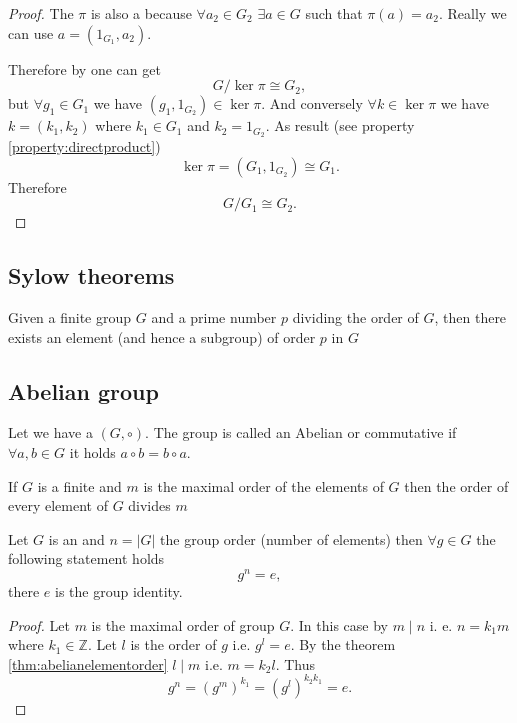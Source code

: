 \begin{appendices}
\begin{property}
\begin{proof}
    The $\pi$ is also a  because $\forall a_2
    \in G_2$ $\exists a \in G$ such that $\pi(a) = a_2$. Really we can
    use $a = (1_{G_1}, a_2)$.
    
    Therefore by  one can get
    \[
    G/\ker{\pi} \cong G_2,
    \]
    but $\forall g_1 \in G_1$ we have $(g_1, 1_{G_2}) \in \ker{\pi}$.
    And conversely $\forall k \in \ker \pi$ we have $k = (k_1, k_2)$
    where $k_1 \in G_1$ and $k_2 = 1_{G_2}$.
    As result (see property \ref{property:directproduct})
    \[
    \ker \pi = \left(G_1, 1_{G_2}\right) \cong G_1.
    \]
    Therefore
    \[
    G/G_1 \cong G_2.
    \]
  \end{proof}
\end{property}

\subsection{Sylow theorems}

\begin{corollary}[Sylow]
  Given a finite group $G$ and a prime number $p$ dividing the order of $G$,
  then there exists an element (and hence a subgroup) of order $p$ in
  $G$ \cite{wiki:sylow}
  \label{cor:sylow}
\end{corollary}

\subsection{Abelian group}

\begin{definition}
  Let we have a  $\left(G, \circ\right)$.
  The group is called an Abelian or commutative if
  $\forall a, b \in G$ it holds $a \circ b = b \circ a$.
  \label{def:abeliangroup}
\end{definition}

\begin{theorem}
  If $G$ is a finite  and $m$ is the maximal
  order of the elements of $G$ then the order of every element of $G$
  divides $m$ 
  \label{thm:abelianelementorder}
\end{theorem}

\begin{theorem}
  Let $G$ is an  and $n = \left|G\right|$
  the group order (number of elements) then $\forall g \in G$ the
  following statement holds
  \[
  g^n = e,
  \]
  there $e$ is the group identity.
  \begin{proof}
    Let $m$ is the maximal order of group $G$. In this case by
     $m \mid n$ i. e. $n = k_1 m$ where $k_1 \in
    \mathbb{Z}$. Let $l$ is the order of $g$ i.e. $g^l = e$. By the
    theorem \ref{thm:abelianelementorder} $l \mid m$ i.e.
    $m = k_2 l$. Thus
    \[
    g^n = \left(g^m\right)^{k_1} = 
    \left(g^l\right)^{k_2 k_1} = e.
    \]
  \end{proof}
  \label{thm:abelianelement}
\end{theorem}


\end{appendices}
